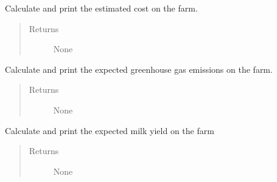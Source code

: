 \documentclass[letterpaper,10pt,english]{sphinxmanual}
\begin{document}
\begin{fulllineitems}
\begin{fulllineitems}
\label{\detokenize{farming:farming.farm1.Farm.get_cost_estimation}}
\sphinxAtStartPar
Calculate and print the estimated cost on the farm.
\begin{quote}\begin{description}
\item[{Returns}] \leavevmode
\sphinxAtStartPar
None

\end{description}\end{quote}

\end{fulllineitems}


\begin{fulllineitems}
\label{\detokenize{farming:farming.farm1.Farm.get_ghg_emissions}}
\sphinxAtStartPar
Calculate and print the expected greenhouse gas emissions on the farm.
\begin{quote}\begin{description}
\item[{Returns}] \leavevmode
\sphinxAtStartPar
None

\end{description}\end{quote}

\end{fulllineitems}


\begin{fulllineitems}
\label{\detokenize{farming:farming.farm1.Farm.get_milk_yield}}
\sphinxAtStartPar
Calculate and print the expected milk yield on the farm
\begin{quote}\begin{description}
\item[{Returns}] \leavevmode
\sphinxAtStartPar
None

\end{description}\end{quote}


\end{fulllineitems}
\end{fulllineitems}
\end{document}
